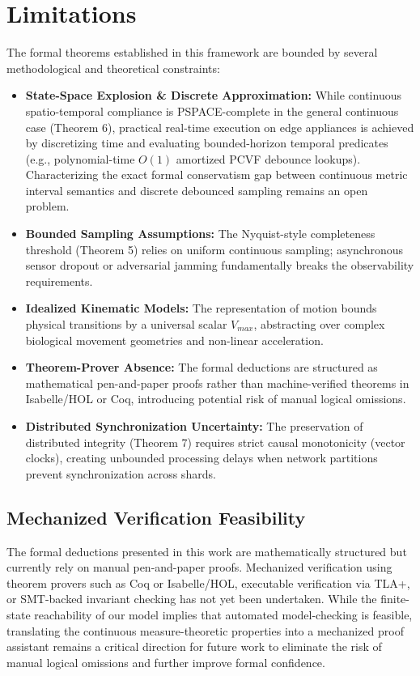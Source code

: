 \documentclass[conference]{IEEEtran}
\begin{document}
\section{Limitations}
The formal theorems established in this framework are bounded by several methodological and theoretical constraints:
\begin{itemize}
    \item \textbf{State-Space Explosion \& Discrete Approximation:} While continuous spatio-temporal compliance is PSPACE-complete in the general continuous case (Theorem 6), practical real-time execution on edge appliances is achieved by discretizing time and evaluating bounded-horizon temporal predicates (e.g., polynomial-time $O(1)$ amortized PCVF debounce lookups). Characterizing the exact formal conservatism gap between continuous metric interval semantics and discrete debounced sampling remains an open problem.
    \item \textbf{Bounded Sampling Assumptions:} The Nyquist-style completeness threshold (Theorem 5) relies on uniform continuous sampling; asynchronous sensor dropout or adversarial jamming fundamentally breaks the observability requirements.
    \item \textbf{Idealized Kinematic Models:} The representation of motion bounds physical transitions by a universal scalar $V_{max}$, abstracting over complex biological movement geometries and non-linear acceleration.
    \item \textbf{Theorem-Prover Absence:} The formal deductions are structured as mathematical pen-and-paper proofs rather than machine-verified theorems in Isabelle/HOL or Coq, introducing potential risk of manual logical omissions.
    \item \textbf{Distributed Synchronization Uncertainty:} The preservation of distributed integrity (Theorem 7) requires strict causal monotonicity (vector clocks), creating unbounded processing delays when network partitions prevent synchronization across shards.
\end{itemize}

\subsection{Mechanized Verification Feasibility}
The formal deductions presented in this work are mathematically structured but currently rely on manual pen-and-paper proofs. Mechanized verification using theorem provers such as Coq or Isabelle/HOL, executable verification via TLA+, or SMT-backed invariant checking has not yet been undertaken. While the finite-state reachability of our model implies that automated model-checking is feasible, translating the continuous measure-theoretic properties into a mechanized proof assistant remains a critical direction for future work to eliminate the risk of manual logical omissions and further improve formal confidence.
\end{document}
